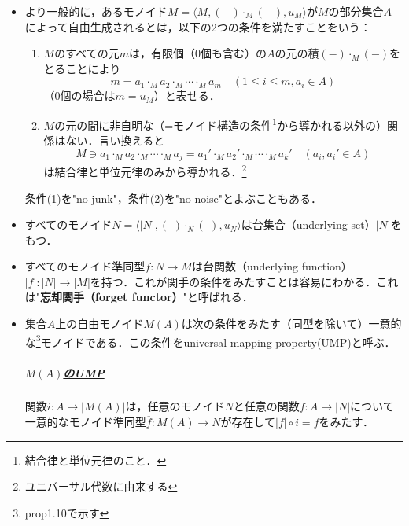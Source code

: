\documentclass[dvipdfmx,a4j,10pt]{jsarticle}
\theoremstyle{mystyle1}
\theoremstyle{mystyle2}
\begin{document}
\begin{itemize}
    \item より一般的に，あるモノイド$M=\langle M,(\mathrm{-})\cdot_M(\mathrm{-}),u_M\rangle$が$M$の部分集合$A$によって自由生成されるとは，以下の2つの条件を満たすことをいう：
          \begin{enumerate}
              \item $M$のすべての元$m$は，有限個（0個も含む）の$A$の元の積$(\mathrm{-})\cdot_M(\mathrm{-})$をとることにより
                    \[
                        m=a_1\cdot_M a_2\cdot_M\cdots\cdot_M a_m\quad(1\leq i\leq m,a_i\in A)
                    \]
                    （0個の場合は$m=u_M$）と表せる．
              \item $M$の元の間に非自明な（=モノイド構造の条件\footnote{結合律と単位元律のこと．}から導かれる以外の）関係はない．言い換えると
                    \[
                        M\ni a_1\cdot_M a_2\cdot_M\cdots\cdot_M a_j = a_1'\cdot_Ma_2'\cdot_M\cdots\cdot_M a_k'\quad(a_i,a_i'\in A)
                    \]
                    は結合律と単位元律のみから導かれる．\footnote{ユニバーサル代数に由来する}
          \end{enumerate}
          条件(1)を"no junk"，条件(2)を"no noise"とよぶこともある．
    \item すべてのモノイド$N=\langle|N|,(\textrm{-})\cdot_N(\textrm{-}),u_N\rangle$は台集合（underlying set）$|N|$をもつ．
    \item すべてのモノイド準同型$f:N\to M$は台関数（underlying function）$|f|:|N|\to|M|$を持つ．これが関手の条件をみたすことは容易にわかる．これは"\textbf{忘却関手（forget functor）}"と呼ばれる．
    \item 集合$A$上の自由モノイド$M(A)$は次の条件をみたす（同型を除いて）一意的な\footnote{prop1.10で示す}モノイドである．この条件をuniversal mapping property(UMP)と呼ぶ．
          \subparagraph{\underline{$M(A)$のUMP}}
          関数$i:A\to|M(A)|$は，任意のモノイド$N$と任意の関数$f:A\to|N|$について一意的なモノイド準同型$\overline{f}:M(A)\to N$が存在して$|f|\circ i=f$をみたす．


\end{itemize}
\end{document}
